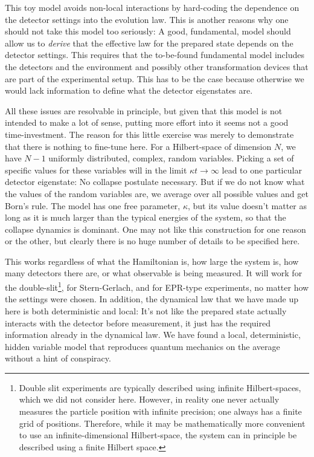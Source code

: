 \documentclass[11pt,twoside,A4]{article}
\begin{document}
This toy model avoids non-local interactions by hard-coding the dependence on the detector settings into the evolution law.  This is another reasons why one should not take this model too seriously: A good, fundamental, model should allow us to {\sl derive} that the effective law for the prepared state depends on the detector settings. This requires that the to-be-found fundamental model includes the detectors and the environment and possibly other transformation devices that are part of the experimental setup. This has to be the case because otherwise we would lack information to define what the detector eigenstates are.

All these issues are resolvable in principle, but given that this model is not intended to make a lot of sense, putting more effort into it seems not a good time-investment. The reason for this little exercise was merely to demonstrate that there is nothing to fine-tune here. 
For a Hilbert-space of dimension $N$, we have $N-1$ uniformly distributed, complex, random variables. Picking a set of specific values for these variables will in the limit $\kappa t \to \infty$ lead to one particular detector eigenstate: No collapse postulate necessary. But if we do not know what the values of the random variables are, we average over all possible values and get Born's rule. The model has one free parameter, $\kappa$, but its value doesn't matter as long as it is much larger than the typical energies of the system, so that the collapse dynamics is dominant. One may not like this construction for one reason or the other, but clearly there is no huge number of details to be specified here.

This works regardless of what the Hamiltonian is, how large the system is, how many detectors there are, or what observable is being measured. It will work for the double-slit\footnote{Double slit experiments are typically described using infinite Hilbert-spaces, which we did not consider here. However, in reality one never actually measures the particle position with infinite precision; one always has a finite grid of positions. Therefore, while it may be mathematically more convenient to use an infinite-dimensional Hilbert-space, the system can in principle be described using a finite Hilbert space.}, for Stern-Gerlach, and for {\sc EPR}-type
experiments, no matter how the settings were chosen. In addition, the dynamical law that we have made up here is both deterministic and local: It's not like the prepared state actually interacts with the detector before measurement, it just has the required information already in the dynamical law. We have found a local, deterministic, hidden variable model that reproduces quantum mechanics on the average without a hint of conspiracy. 
\end{document}
